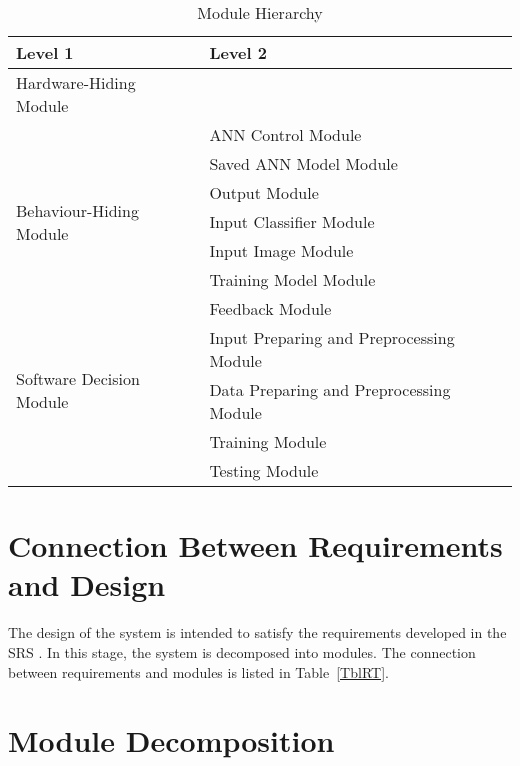 \documentclass[12pt, titlepage]{article}
\begin{document}
\begin{table}[h!]
\centering
\begin{tabular}{p{} p{}}
\toprule
\textbf{Level 1} & \textbf{Level 2}\\
\midrule

{Hardware-Hiding Module} & ~ \\
\midrule

\multirow{7}{0.3\textwidth}{Behaviour-Hiding Module}
&ANN Control Module\\
&Saved ANN Model Module\\
&Output Module\\
&Input Classifier Module\\
&Input Image Module\\
&Training Model Module\\
&Feedback Module\\
\midrule

\multirow{3}{0.3\textwidth}{Software Decision Module}
&Input Preparing and Preprocessing Module\\
&Data Preparing and Preprocessing Module\\
&Training Module\\
&Testing Module\\

\bottomrule

\end{tabular}
\caption{Module Hierarchy}
\label{TblMH}
\end{table}

\section{Connection Between Requirements and Design} \label{SecConnection}

The design of the system is intended to satisfy the requirements developed in
the SRS \cite{SRS}. In this stage, the system is decomposed into modules. The connection
between requirements and modules is listed in Table~\ref{TblRT}.


\section{Module Decomposition} \label{SecMD}
\end{document}
